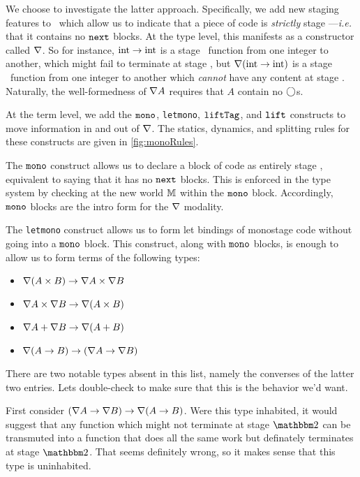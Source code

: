 We choose to investigate the latter approach.
Specifically, we add new staging features to \lang\ which allow us to indicate that a piece of code is {\em strictly} 
stage \bbone---{\em i.e.} that it contains no ${\tt next}$ blocks.
At the type level, this manifests as a constructor called $\nabla$.
So for instance, ${\rm int} \to {\rm int}$ is a stage \bbone\ function from one integer to another,
which might fail to terminate at stage \bbtwo,  
but $\nabla ({\rm int} \to {\rm int})$ is a stage \bbone\ function from one integer to another
which {\em cannot} have any content at stage \bbtwo.
Naturally, the well-formedness of $\nabla A$ requires that $A$ contain no $\bigcirc$s.

At the term level, we add the 
${\tt mono}$, \texttt{letmono}, ${\tt liftTag}$, and ${\tt lift}$ 
constructs to move information in and out of $\nabla$.  
The statics, dynamics, and splitting rules for these constructs are given in \cref{fig:monoRules}.

The ${\tt mono}$ construct allows us to declare a block of code as entirely stage \bbone,
equivalent to saying that it has no ${\tt next}$ blocks.
This is enforced in the type system by checking at the new world $\mathbb{M}$ within the ${\tt mono}$ block.
Accordingly, ${\tt mono}$ blocks are the intro form for the $\nabla$ modality. 

The \texttt{letmono} construct allows us to form let bindings of monostage code without going into a ${\tt mono}$ block.
This construct, along with ${\tt mono}$ blocks, is enough to allow us to form terms of the following types:
\begin{itemize}
\item $\nabla(A \times B) \to \nabla A \times \nabla B$ 
\item $\nabla A \times \nabla B \to \nabla(A \times B)$
\item $\nabla A + \nabla B \to \nabla(A + B)$
\item $\nabla(A \to B) \to (\nabla A \to \nabla B)$
\end{itemize}
There are two notable types absent in this list, namely the converses of the latter two entries.
Lets double-check to make sure that this is the behavior we'd want.

First consider $(\nabla A \to \nabla B) \to \nabla(A \to B)$.
Were this type inhabited, it would suggest that any function which might not terminate at stage $\bbtwo$
can be transmuted into a function that does all the same work but definately terminates at stage $\bbtwo$.
That seems definitely wrong, so it makes sense that this type is uninhabited.

